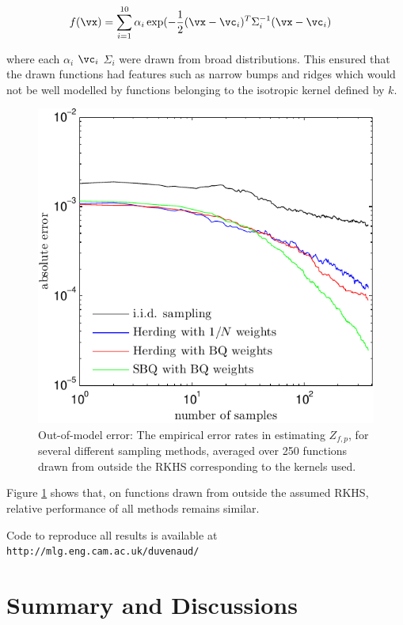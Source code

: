 \begin{align}
f(\vx) & = \sum_{i=1}^{10} \alpha_i \exp(-\frac{1}{2} (\vx -\vc_i)^T \Sigma_i^{-1} (\vx -\vc_i)
\end{align}

where each $\alpha_i$ $\vc_i$ $\Sigma_i$ were drawn from broad distributions. This ensured that the drawn functions had features such as narrow bumps and ridges which would not be well modelled by functions belonging to the isotropic kernel defined by $k$.

\begin{figure}
\includegraphics[width=\columnwidth]{figs/herding/error_curve_outmodel_400_v3}
\caption[Out-of-model error of Bayeisan quadrature, herding and random sampling]{Out-of-model error: The empirical error rates in estimating $Z_{f,p}$, for several different sampling methods, averaged over 250 functions drawn from outside the RKHS corresponding to the kernels used.}
\label{fig:error_curve_outmodel}
\end{figure}

Figure \ref{fig:error_curve_outmodel} shows that, on functions drawn from outside the assumed RKHS, relative performance of all methods remains similar.

Code to reproduce all results is available at \texttt{http://mlg.eng.cam.ac.uk/duvenaud/}

\section{Summary and Discussions}

